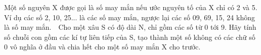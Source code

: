 Một số nguyên X được gọi là số may mắn nếu ước nguyên tố của X chỉ có 2 và 5. Ví dụ các số 2, 10, 25... là các số may mắn, ngược lại các số 09, 69, 15, 24 không là số may mắn.  Cho một xâu S có độ dài N, chỉ gồm các số từ 0 tới 9. Hãy tính số chuỗi con gồm các kí tự liên tiếp của S, tạo thành một số không có các chữ số 0 vô nghĩa ở đầu và chia hết cho một số may mắn X cho trước.